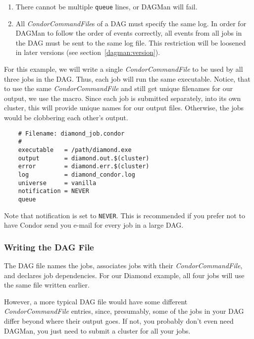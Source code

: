 \begin{enumerate}

\item {}
There cannot be multiple \texttt{queue} lines, or DAGMan will fail.

\item All \textit{CondorCommandFile}s of a DAG must specify the same log.
In order for DAGMan to follow the order of events correctly, all events from
all jobs in the DAG must be sent to the same log file.  This restriction will
be loosened in later versions (see section~\ref{dagman:version}).

\end{enumerate}

For this example, we will write a single \textit{CondorCommandFile} to be used
by all three jobs in the DAG.  Thus, each job will run the same executable.
Notice, that to use the same \textit{CondorCommandFile} and still get
unique filenames for our output, we use the  macro.
Since each job is submitted separately, into its own cluster, this
will provide unique names for our output files.
Otherwise, the jobs would be clobbering each other's output.  

\begin{verbatim}
	# Filename: diamond_job.condor
	#
	executable   = /path/diamond.exe
	output       = diamond.out.$(cluster)
	error        = diamond.err.$(cluster)
	log          = diamond_condor.log
	universe     = vanilla
	notification = NEVER
	queue
\end{verbatim}

Note that notification is set to \texttt{NEVER}.  This is recommended if you
prefer not to have Condor send you e-mail for every job in a large DAG.

\subsubsection{\label{dagman:writedag}Writing the DAG File}

The DAG file names the jobs, associates jobs with their
\textit{CondorCommandFile}, and declares job dependencies.  For our Diamond
example, all four jobs will use the same  file
written earlier.

However, a more typical DAG file would have some different 
\textit{CondorCommandFile} entries, since, presumably, some of the
jobs in your DAG differ beyond where their output goes.
If not, you probably don't even need DAGMan, you just need to submit a
cluster for all your jobs.

